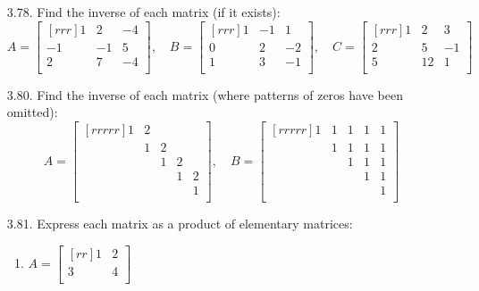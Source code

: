 \documentclass[12pt]{article}
\begin{document}
\begin{enumerate}
\item [3.78.] Find the inverse of each matrix (if it exists):
	\[	A= \begin{bmatrix}[rrr] 1 & 2 & -4\\ -1 & -1 & 5\\ 2 & 7 & -4\\ \end{bmatrix}, \quad
		B= \begin{bmatrix}[rrr] 1 & -1 & 1\\ 0 & 2 & -2\\ 1 & 3 & -1\\ \end{bmatrix}, \quad
		C= \begin{bmatrix}[rrr] 1 & 2 & 3\\ 2 & 5 & -1\\ 5 & 12 & 1\\ \end{bmatrix} \]


\item [3.80.] Find the inverse of each matrix (where patterns of zeros have been omitted):
	\[ 	A= \begin{bmatrix}[rrrrr] 	1  & 2  & {} & {} & {}\\
									{} & 1  & 2  & {} & {}\\
									{} & {} & 1  & 2  & {}\\
									{} & {} & {} & 1  & 2 \\
									{} & {} & {} & {} & 1\\ \end{bmatrix}, \quad
		B= \begin{bmatrix}[rrrrr]	1  & 1  & 1  & 1  & 1\\
									{} & 1  & 1  & 1  & 1\\
									{} & {} & 1  & 1  & 1\\
									{} & {} & {} & 1  & 1\\
									{} & {} & {} & {} & 1\\ \end{bmatrix} \]


\item [3.81.] Express each matrix as a product of elementary matrices:
	\begin{enumerate}
	\item $A= \begin{bmatrix}[rr] 1 & 2\\ 3 & 4\\ \end{bmatrix}$\\
	

\end{enumerate}
\end{enumerate}
\end{document}

